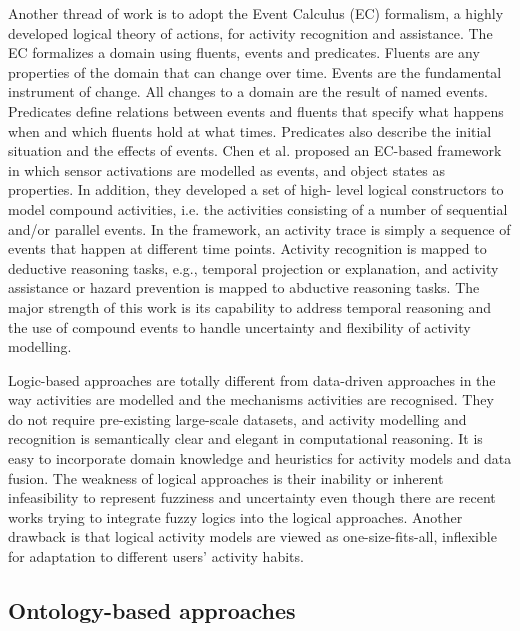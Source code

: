Another thread of work is to adopt the Event Calculus (EC) \cite{Shanahan1997} formalism, a highly developed logical theory of actions, for activity recognition and assistance. The EC formalizes a domain using fluents, events and predicates. Fluents are any properties of the domain that can change over time. Events are the fundamental instrument of change. All changes to a domain are the result of named events. Predicates define relations between events and fluents that specify what happens when and which fluents hold at what times. Predicates also describe the initial situation and the effects of events. Chen et al. \cite{Chen2008} proposed an EC-based framework in which sensor activations are modelled as events, and object states as properties. In addition, they developed a set of high- level logical constructors to model compound activities, i.e. the activities consisting of a number of sequential and/or parallel events. In the framework, an activity trace is simply a sequence of events that happen at different time points. Activity recognition is mapped to deductive reasoning tasks, e.g., temporal projection or explanation, and activity assistance or hazard prevention is mapped to abductive reasoning tasks. The major strength of this work is its capability to address temporal reasoning and the use of compound events to handle uncertainty and flexibility of activity modelling. 

Logic-based approaches are totally different from data-driven approaches in the way activities are modelled and the mechanisms activities are recognised. They do not require pre-existing large-scale datasets, and activity modelling and recognition is semantically clear and elegant in computational reasoning. It is easy to incorporate domain knowledge and heuristics for activity models and data fusion. The weakness of logical approaches is their inability or inherent infeasibility to represent fuzziness and uncertainty even though there are recent works trying to integrate fuzzy logics into the logical approaches. Another drawback is that logical activity models are viewed as one-size-fits-all, inflexible for adaptation to different users’ activity habits.

\subsection{Ontology-based approaches}
\label{subsec:soa:ontology}

